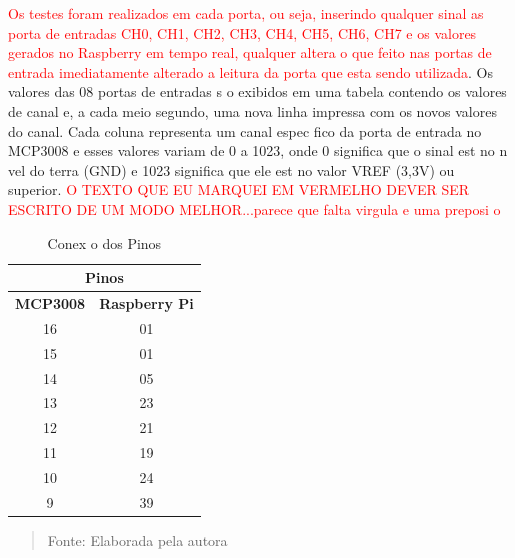 \documentclass{article}
\begin{document}
\textcolor{red}{Os testes foram realizados em cada porta, ou seja, inserindo qualquer sinal as porta de entradas CH0, CH1, CH2, CH3, CH4, CH5, CH6, CH7 e os valores gerados no Raspberry em tempo real, qualquer altera o que   feito nas portas de entrada   imediatamente alterado a leitura da porta que esta sendo utilizada}. Os valores das 08 portas de entradas s o exibidos em uma tabela contendo os valores de canal e, a cada meio segundo, uma nova linha   impressa com os novos valores do canal. Cada coluna representa um canal espec fico da porta de entrada no MCP3008 e esses valores variam de 0 a 1023, onde 0 significa que o sinal est  no n vel do terra (GND) e 1023 significa que ele est  no valor VREF (3,3V) ou superior. \textcolor{red}{O TEXTO QUE EU MARQUEI EM VERMELHO DEVER  SER ESCRITO DE UM MODO MELHOR...parece que falta virgula e uma preposi o}

\begin{table}[H]
\centering
\caption{Conex o dos Pinos}
\begin{center}
\label{my-label}
\begin{tabular}{|c|c|}
\hline
\multicolumn{2}{|c|}{\textbf{Pinos}} \\ \hline
\multicolumn{1}{|l|}{\textbf{MCP3008}} & \multicolumn{1}{l|}{\textbf{Raspberry Pi}} \\ \hline
16 & 01 \\ \hline
15 & 01 \\ \hline
14 & 05 \\ \hline
13 & 23 \\ \hline
12 & 21 \\ \hline
11 & 19 \\ \hline
10 & 24 \\ \hline
9 & 39 \\ \hline
\end{tabular}
\end{center}
 \vspace*{\fill} 
            \begin{quote}
            \centering 
            \vspace{12pt}Fonte: {Elaborada pela autora} 
            \end{quote}
            \vspace*{\fill}
			\label{fig:ramcor}
\end{table}
\end{document}
